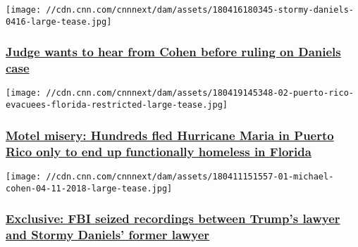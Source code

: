 \texttt{[image: //cdn.cnn.com/cnnnext/dam/assets/180416180345-stormy-daniels-0416-large-tease.jpg]}

\hypertarget{judge-wants-to-hear-from-cohen-before-ruling-on-daniels-case}{%
\subsubsection{\texorpdfstring{\href{/2018/04/20/politics/stormy-daniels-donald-trump-michael-cohen-court/index.html}{Judge
wants to hear from Cohen before ruling on Daniels
case}}{Judge wants to hear from Cohen before ruling on Daniels case}}\label{judge-wants-to-hear-from-cohen-before-ruling-on-daniels-case}}

\href{/2018/04/20/politics/sutter-puerto-rico-motel-misery-invs/index.html}{}

\texttt{[image: //cdn.cnn.com/cnnnext/dam/assets/180419145348-02-puerto-rico-evacuees-florida-restricted-large-tease.jpg]}

\hypertarget{motel-misery-hundreds-fled-hurricane-maria-in-puerto-rico-only-to-end-up-functionally-homeless-in-florida}{%
\subsubsection{\texorpdfstring{\href{/2018/04/20/politics/sutter-puerto-rico-motel-misery-invs/index.html}{Motel
misery: Hundreds fled Hurricane Maria in Puerto Rico only to end up
functionally homeless in
Florida}}{Motel misery: Hundreds fled Hurricane Maria in Puerto Rico only to end up functionally homeless in Florida}}\label{motel-misery-hundreds-fled-hurricane-maria-in-puerto-rico-only-to-end-up-functionally-homeless-in-florida}}

\href{/2018/04/13/politics/fbi-phone-recordings-cohen-daniels-mcdougal/index.html}{}

\texttt{[image: //cdn.cnn.com/cnnnext/dam/assets/180411151557-01-michael-cohen-04-11-2018-large-tease.jpg]}

\hypertarget{exclusive-fbi-seized-recordings-between-trumps-lawyer-and-stormy-daniels-former-lawyer}{%
\subsubsection{\texorpdfstring{\href{/2018/04/13/politics/fbi-phone-recordings-cohen-daniels-mcdougal/index.html}{Exclusive:
FBI seized recordings between Trump's lawyer and Stormy Daniels' former
lawyer}}{Exclusive: FBI seized recordings between Trump's lawyer and Stormy Daniels' former lawyer}}\label{exclusive-fbi-seized-recordings-between-trumps-lawyer-and-stormy-daniels-former-lawyer}}

